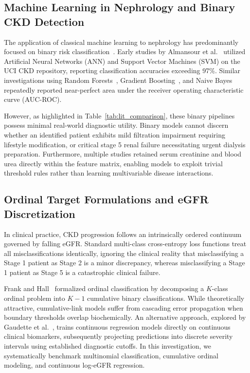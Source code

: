 \documentclass[conference]{IEEEtran}
\begin{document}
\subsection{Machine Learning in Nephrology and Binary CKD Detection}
The application of classical machine learning to nephrology has predominantly focused on binary risk classification~\cite{chittora2021efficient, boukenze2016predicting, misir2022performance}. Early studies by Almansour et al.~\cite{almansour2019neural} utilized Artificial Neural Networks (ANN) and Support Vector Machines (SVM) on the UCI CKD repository, reporting classification accuracies exceeding 97\%. Similar investigations using Random Forests~\cite{senan2021machine}, Gradient Boosting~\cite{debal2022comparative}, and Naive Bayes~\cite{rubini2015prediction} repeatedly reported near-perfect area under the receiver operating characteristic curve (AUC-ROC).

However, as highlighted in Table~\ref{tab:lit_comparison}, these binary pipelines possess minimal real-world diagnostic utility. Binary models cannot discern whether an identified patient exhibits mild filtration impairment requiring lifestyle modification, or critical stage 5 renal failure necessitating urgent dialysis preparation. Furthermore, multiple studies retained serum creatinine and blood urea directly within the feature matrix, enabling models to exploit trivial threshold rules rather than learning multivariable disease interactions.



\subsection{Ordinal Target Formulations and eGFR Discretization}
In clinical practice, CKD progression follows an intrinsically ordered continuum governed by falling eGFR. Standard multi-class cross-entropy loss functions treat all misclassifications identically, ignoring the clinical reality that misclassifying a Stage 1 patient as Stage 2 is a minor discrepancy, whereas misclassifying a Stage 1 patient as Stage 5 is a catastrophic clinical failure.

Frank and Hall~\cite{frank2001simple} formalized ordinal classification by decomposing a $K$-class ordinal problem into $K-1$ cumulative binary classifications. While theoretically attractive, cumulative-link models suffer from cascading error propagation when boundary thresholds overlap biochemically. An alternative approach, explored by Gaudette et al.~\cite{gaudette2016evaluation}, trains continuous regression models directly on continuous clinical biomarkers, subsequently projecting predictions into discrete severity intervals using established diagnostic cutoffs. In this investigation, we systematically benchmark multinomial classification, cumulative ordinal modeling, and continuous log-eGFR regression.
\end{document}
